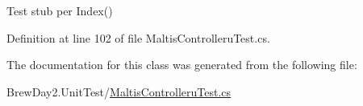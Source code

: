Test stub per Index()



Definition at line 102 of file Maltis\+Controlleru\+Test.\+cs.



The documentation for this class was generated from the following file\+:\begin{DoxyCompactItemize}
\item 
Brew\+Day2.\+Unit\+Test/\mbox{\hyperlink{_maltis_controlleru_test_8cs}{Maltis\+Controlleru\+Test.\+cs}}\end{DoxyCompactItemize}
